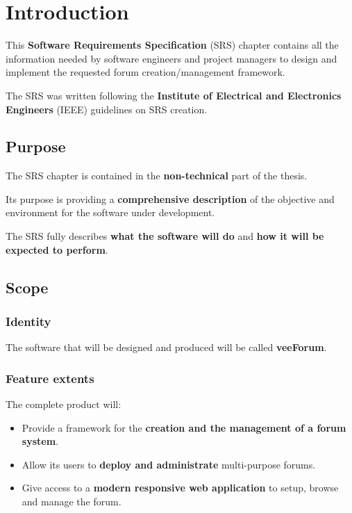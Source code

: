 \documentclass[12pt]{report}
\renewcommand\emph{\textbf}
\begin{document}
            \section{Introduction}
                This \emph{Software Requirements Specification} (SRS) chapter contains all the information needed by software engineers and project managers to design and implement the requested forum creation/management framework.

                The SRS was written following the \emph{Institute of Electrical and Electronics Engineers} (IEEE) guidelines on SRS creation.

                \subsection{Purpose}
                    The SRS chapter is contained in the \emph{non-technical} part of the thesis.

                    Its purpose is providing a \emph{comprehensive description} of the objective and environment for the software under development.

                    The SRS fully describes \emph{what the software will do} and \emph{how it will be expected to perform}.



                \subsection{Scope}

                    \subsubsection{Identity}
                        The software that will be designed and produced will be called \emph{veeForum}.

                    \subsubsection{Feature extents}

                        The complete product will:

                        \begin{itemize}
                            \item Provide a framework for the \emph{creation and the management of a forum system}.
                            \item Allow its users to \emph{deploy and administrate} multi-purpose forums.
                            \item Give access to a \emph{modern responsive web application} to setup, browse and manage the forum.
                        \end{itemize}
\end{document}
